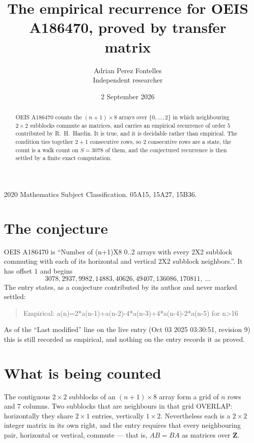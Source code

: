 \documentclass[11pt,a4paper]{article}
\title{The empirical recurrence for OEIS A186470, proved by transfer matrix}
\author{Adrian Perez Fontelles\\ \small Independent researcher}
\date{2 September 2026}
\theoremstyle{plain}
\theoremstyle{definition}
\begin{document}
\maketitle

\begin{abstract}
OEIS A186470 counts the $(n+1)\times8$ arrays over $\{0,\dots,2\}$ in which
neighbouring $2\times2$ subblocks commute as matrices, and carries an empirical
recurrence
of order $5$ contributed by R.~H.~Hardin. It is true, and it is decidable rather than
empirical. The condition ties together $2+1$ consecutive rows, so $2$ consecutive rows are
a state, the count is a walk count on $S=3078$ of them, and the conjectured recurrence is then
settled by a finite exact computation.
\end{abstract}

\noindent\small 2020 Mathematics Subject Classification. 05A15, 15A27, 15B36.\normalsize

\section{The conjecture}

OEIS A186470 is ``Number of (n+1)X8 0..2 arrays with every 2X2 subblock commuting with each of its horizontal and vertical 2X2 subblock neighbors.''. It has offset $1$ and begins
\[
3078, 2937, 9982, 14883, 40626, 49407, 136086, 170811,\ \dots
\]
The entry states, as a conjecture contributed by its author and never marked settled:
\begin{quote}
Empirical: a(n)=2*a(n-1)+a(n-2)-4*a(n-3)+4*a(n-4)-2*a(n-5) for n>16
\end{quote}
As of the ``Last modified'' line on the live entry (Oct 03 2025 03:30:51, revision 9) this is still
recorded as empirical, and nothing on the entry records it as proved.

\section{What is being counted}

The contiguous $2\times2$ subblocks of an $(n+1)\times8$ array form a grid of $n$
rows and $7$ columns. Two subblocks that are neighbours in that
grid OVERLAP: horizontally they share $2\times1$ entries, vertically
$1\times2$. Nevertheless each is a $2\times2$ integer matrix in its own right, and
the entry requires that every neighbouring pair, horizontal or vertical, commute --- that is,
$AB=BA$ as matrices over $\mathbf{Z}$.
\end{document}
